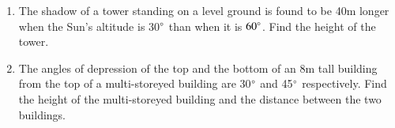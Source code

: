 \begin{enumerate}[label=\thesection.\arabic*.,ref=\thesection.\theenumi]
\item The shadow of a tower standing on a level ground is found to be 40m longer when the Sun's altitude is 30$\degree$ than when it is $60\degree$.  Find the height of the tower.
%
%
\item The angles of depression of the top and the bottom of an 8m tall building from the top of a multi-storeyed building are 30$\degree$ and 45$\degree$ respectively.  Find the height of the multi-storeyed building and the distance between the two buildings.
%

\end{enumerate}
